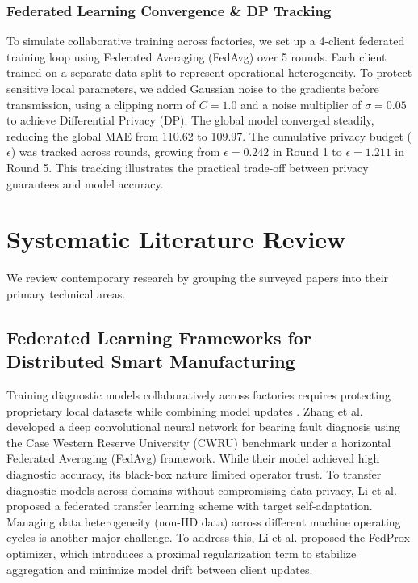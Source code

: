\documentclass[journal,10pt,compsoc]{IEEEtran}
\begin{document}
\subsubsection{Federated Learning Convergence \& DP Tracking}
To simulate collaborative training across factories, we set up a 4-client federated training loop using Federated Averaging (FedAvg) over 5 rounds. Each client trained on a separate data split to represent operational heterogeneity. To protect sensitive local parameters, we added Gaussian noise to the gradients before transmission, using a clipping norm of $C=1.0$ and a noise multiplier of $\sigma=0.05$ to achieve Differential Privacy (DP). The global model converged steadily, reducing the global MAE from 110.62 to 109.97. The cumulative privacy budget ($\epsilon$) was tracked across rounds, growing from $\epsilon = 0.242$ in Round 1 to $\epsilon = 1.211$ in Round 5. This tracking illustrates the practical trade-off between privacy guarantees and model accuracy.

\section{Systematic Literature Review}
\label{sec:literature}

We review contemporary research by grouping the surveyed papers into their primary technical areas.

\subsection{Federated Learning Frameworks for Distributed Smart Manufacturing}
Training diagnostic models collaboratively across factories requires protecting proprietary local datasets while combining model updates \cite{kairouz_fl_advances}. Zhang et al. \cite{zhang_fed} developed a deep convolutional neural network for bearing fault diagnosis using the Case Western Reserve University (CWRU) benchmark under a horizontal Federated Averaging (FedAvg) framework. While their model achieved high diagnostic accuracy, its black-box nature limited operator trust. To transfer diagnostic models across domains without compromising data privacy, Li et al. \cite{kone_fed_fault} proposed a federated transfer learning scheme with target self-adaptation. Managing data heterogeneity (non-IID data) across different machine operating cycles is another major challenge. To address this, Li et al. \cite{li_fedprox} proposed the FedProx optimizer, which introduces a proximal regularization term to stabilize aggregation and minimize model drift between client updates.
\end{document}
